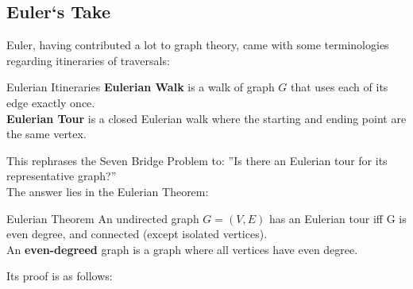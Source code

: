 \subsection{Euler`s Take}
Euler, having contributed a lot to graph theory, came with some terminologies regarding itineraries of traversals:
\begin{ln-define}{Eulerian Itineraries}{}
    \textbf{Eulerian Walk} is a walk of graph $G$ that uses each of its edge exactly once. \\
    \textbf{Eulerian Tour} is a closed Eulerian walk where the starting and ending point are the same vertex.
\end{ln-define}
This rephrases the Seven Bridge Problem to: ''Is there an Eulerian tour for its representative graph?'' \\
The answer lies in the Eulerian Theorem:
\begin{ln-theorem}{Eulerian Theorem}{}
    An undirected graph $G = (V, E)$ has an Eulerian tour iff G is even degree, and connected (except isolated vertices). \\
    An \textbf{even-degreed} graph is a graph where all vertices have even degree.
\end{ln-theorem}
Its proof is as follows:
